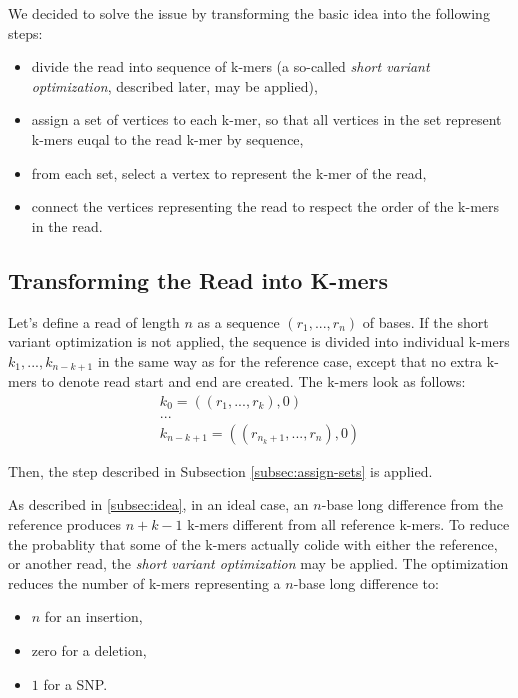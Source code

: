 We decided to solve the issue by transforming the basic idea into the following steps:
\begin{itemize}
\item divide the read into sequence of k-mers (a so-called \textit{short variant optimization}, described later, may be applied),
\item assign a set of vertices to each k-mer, so that all vertices in the set represent k-mers euqal to the read k-mer by sequence,
\item from each set, select a vertex to represent the k-mer of the read,
\item connect the vertices representing the read to respect the order of the k-mers in the read.
\end{itemize}

\subsection{Transforming the Read into K-mers}
\label{subsec:transforming-the-read-info-k-mers}

Let's define a read of length $n$ as a sequence $(r_1, ..., r_n)$ of bases. If the short variant optimization is not applied, the sequence is divided into individual k-mers $k_1, ..., k_{n-k+1}$ in the same way as for the reference case, except that no extra k-mers to denote read start and end are created. The k-mers look as follows:
\begin{gather}
k_0 = ((r_1, ..., r_k), 0) \\
... \\
k_{n-k+1} = ((r_{n_k+1}, ...,r_n), 0)
\end{gather}

Then, the step described in Subsection \ref{subsec:assign-sets} is applied.

As described in \ref{subsec:idea}, in an ideal case, an $n$-base long difference from the reference produces $n + k - 1$ k-mers different from all reference k-mers. To reduce the probablity that some of the k-mers actually colide with either the reference, or another read, the \textit{short variant optimization} may be applied. The optimization reduces the number of k-mers representing a $n$-base long difference to:
\begin{itemize}
\item $n$ for an insertion,
\item zero for a deletion,
\item $1$ for a SNP.
\end{itemize}


